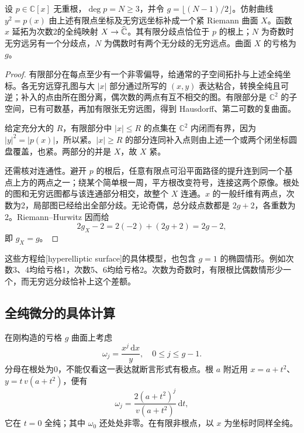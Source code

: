 \begin{proposition}[二重覆盖的紧曲面模型]\label{b3:prop:A-hyperelliptic-model}
设 \(p\in\mathbb C[x]\) 无重根，\(\deg p=N\ge3\)，并令 \(g=\lfloor(N-1)/2\rfloor\)。仿射曲线 \(y^2=p(x)\) 由上述有限点坐标及无穷远坐标补成一个紧 Riemann 曲面 \(X\)。函数 \(x\) 延拓为次数2的全纯映射 \(X\rightarrow\widehat{\mathbb C\kern0pt}\)。其有限分歧点恰位于 \(p\) 的根上；\(N\) 为奇数时无穷远另有一个分歧点，\(N\) 为偶数时有两个无分歧的无穷远点。曲面 \(X\) 的亏格为 \(g\)。
\end{proposition}
\begin{proof}
有限部分在每点至少有一个非零偏导，给通常的子空间拓扑与上述全纯坐标。各无穷远穿孔图与大 \(|x|\) 部分通过所写的 \((x,y)\) 表达粘合，转换全纯且可逆；补入的点由所在图分离，偶次数的两点有互不相交的图。有限部分是 \(\mathbb C^2\) 的子空间，已有可数基，再加有限张无穷远图，得到 Hausdorff、第二可数的复曲面。

给定充分大的 \(R\)，有限部分中 \(|x|\le R\) 的点集在 \(\mathbb C^2\) 内闭而有界，因为 \(|y|^2=|p(x)|\)，所以紧。\(|x|\ge R\) 的部分连同补入点则由上述一个或两个闭坐标圆盘覆盖，也紧。两部分的并是 \(X\)，故 \(X\) 紧。

还需核对连通性。避开 \(p\) 的根后，任意有限点可沿平面路径的提升连到同一个基点上方的两点之一；绕某个简单根一周，平方根改变符号，连接这两个原像。根处的图和无穷远图都与该连通部分相交，故整个 \(X\) 连通。\(x\) 的一般纤维有两点，次数为2，局部图已经给出全部分歧。无论奇偶，总分歧点数都是 \(2g+2\)，各重数为2。Riemann--Hurwitz 因而给
\[
 2g_X-2=2(-2)+(2g+2)=2g-2,
\]
即 \(g_X=g\)。
\end{proof}

这些方程给[hyperelliptic surface]的具体模型，也包含 \(g=1\) 的椭圆情形。例如次数3、4均给亏格1，次数5、6均给亏格2。次数为奇数时，有限根比偶数情形少一个，而无穷远分歧恰补上这个差额。

\subsection{全纯微分的具体计算}
\label{b3:subsec:A0403}

在刚构造的亏格 \(g\) 曲面上考虑
\[
 \omega_j=\frac{x^j\,\mathrm{d}x}{y},\quad 0\le j\le g-1.
\]
分母在根处为0，不能仅看这一表达就断言形式有极点。根 \(a\) 附近用 \(x=a+t^2\)、\(y=t\,v(a+t^2)\)，便有
\[
 \omega_j=\frac{2(a+t^2)^j}{v(a+t^2)}\,\mathrm{d}t,
\]
它在 \(t=0\) 全纯；其中 \(\omega_0\) 还处处非零。在有限非根点，以 \(x\) 为坐标时同样全纯。

